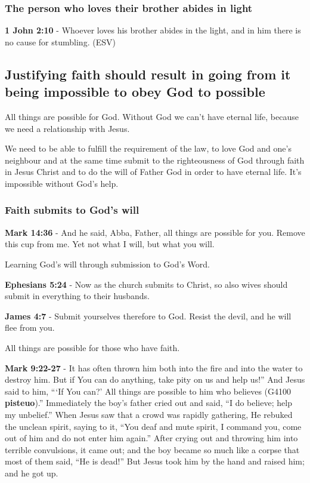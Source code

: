 \documentclass[11pt]{article}
\begin{document}
\subsubsection{The person who loves their brother abides in light}
\label{sec:org4e46ca4}
\textbf{1 John 2:10} - Whoever loves his brother abides in the light, and in him there is no cause for stumbling.  (ESV)

\subsection{Justifying faith should result in going from it being impossible to obey God to possible}
\label{sec:org871d2a2}
All things are possible for God.
Without God we can't have eternal life, because we need a relationship with Jesus.

We need to be able to fulfill the requirement
of the law, to love God and one's neighbour and at the same time
submit to the righteousness of God through faith in Jesus
Christ and to do the will of Father God in
order to have eternal life. It's impossible without God's help.

\subsubsection{Faith submits to God's will}
\label{sec:orgcab24f2}
\textbf{Mark 14:36} - And he said, Abba, Father, all things are possible for you. Remove this cup from me. Yet not what I will, but what you will.

Learning God's will through submission to God's Word.

\textbf{Ephesians 5:24} - Now as the church submits to Christ, so also wives should submit in everything to their husbands.

\textbf{James 4:7} - Submit yourselves therefore to God. Resist the devil, and he will flee from you.

All things are possible for those who have faith.

\textbf{Mark 9:22-27} - It has often thrown him both into the fire and into the water to destroy him. But if You can do anything, take pity on us and help us!” And Jesus said to him, “‘If You can?’ All things are possible to him who believes (G4100 \textbf{pisteuo}).” Immediately the boy’s father cried out and said, “I do believe; help my unbelief.” When Jesus saw that a crowd was rapidly gathering, He rebuked the unclean spirit, saying to it, “You deaf and mute spirit, I command you, come out of him and do not enter him again.” After crying out and throwing him into terrible convulsions, it came out; and the boy became so much like a corpse that most of them said, “He is dead!” But Jesus took him by the hand and raised him; and he got up.
\end{document}
